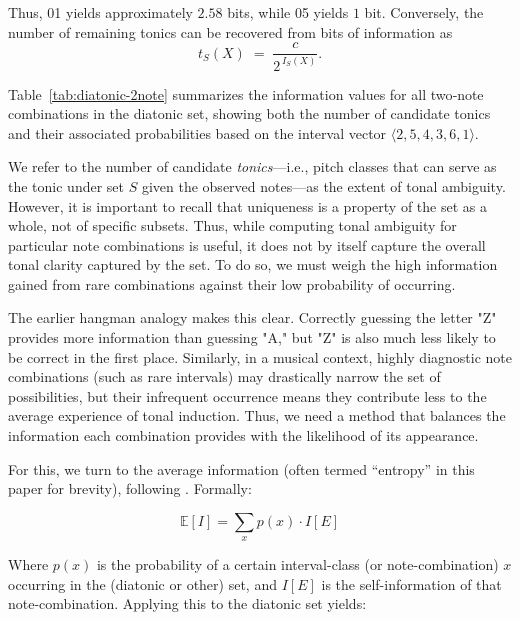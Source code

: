 \documentclass[10pt,twocolumn]{article}
\numberwithin{equation}{section} %
\begin{document}
    Thus, 01 yields approximately $2.58$ bits, while 05 yields $1$ bit. Conversely, the number of remaining tonics can be recovered from bits of information as
    \begin{equation}
        t_S(X) \;=\; \frac{c}{2^{\,I_S(X)}}.
        \label{eq:remaining_transpositions}
    \end{equation}

    Table~\ref{tab:diatonic-2note} summarizes the information values for all two‑note combinations in the diatonic set, showing both the number of candidate tonics and their associated probabilities based on the interval vector $\langle 2,5,4,3,6,1\rangle$.

    

    We refer to the number of candidate \emph{tonics}—i.e., pitch classes that can serve as the tonic under set $S$ given the observed notes—as the extent of tonal ambiguity.
    However, it is important to recall that uniqueness is a property of the set as a whole, not of specific subsets.
    Thus, while computing tonal ambiguity for particular note combinations is useful, it does not by itself capture the overall tonal clarity captured by the set.
    To do so, we must weigh the high information gained from rare combinations against their low probability of occurring.

    The earlier hangman analogy makes this clear.
    Correctly guessing the letter "Z" provides more information than guessing "A," but "Z" is also much less likely to be correct in the first place.
    Similarly, in a musical context, highly diagnostic note combinations (such as rare intervals) may drastically narrow the set of possibilities, but their infrequent occurrence means they contribute less to the average experience of tonal induction.
    Thus, we need a method that balances the information each combination provides with the likelihood of its appearance.

    For this, we turn to the average information (often termed “entropy” in this paper for brevity), following \citet{shannon1948}.
    Formally:

    \begin{equation}
        \mathbb{E}[I] = \sum_{x} p(x) \cdot I[E]
        \label{eq:expected-info}
    \end{equation}

    Where $p(x)$ is the probability of a certain interval-class (or note-combination) $x$ occurring in the (diatonic or other) set, and $I[E]$ is the self-information of that note-combination.
    Applying this to the diatonic set yields:
\end{document}
